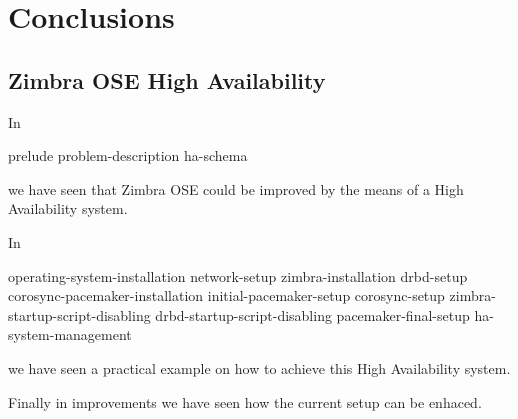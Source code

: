 

\chapter{Conclusions}
\label{chap:conclusions}

\section {Zimbra OSE High Availability}
In 

{prelude}
{problem-description}
{ha-schema}

we have seen that Zimbra OSE could be improved by the means of a High Availability system.

In 

{operating-system-installation}
{network-setup}
{zimbra-installation}
{drbd-setup}
{corosync-pacemaker-installation}
{initial-pacemaker-setup}
{corosync-setup}
{zimbra-startup-script-disabling}
{drbd-startup-script-disabling}
{pacemaker-final-setup}
{ha-system-management}

we have seen a practical example on how to achieve this High Availability system.

Finally in {improvements} we have seen how the current setup can be enhaced.



